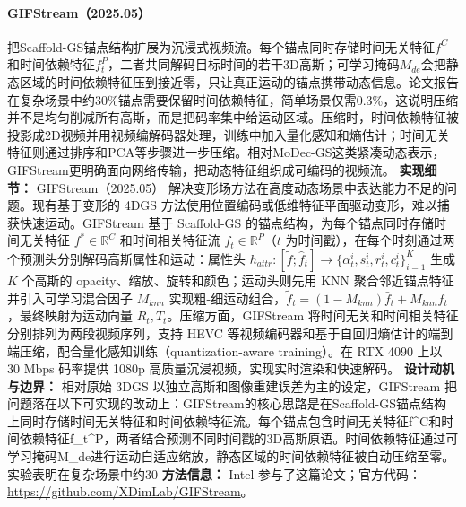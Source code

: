 \paragraph{GIFStream（2025.05）\cite{2505_07539}}
把Scaffold-GS锚点结构扩展为沉浸式视频流。每个锚点同时存储时间无关特征$f^C$和时间依赖特征$f_t^P$，二者共同解码目标时间的若干3D高斯；可学习掩码$M_{de}$会把静态区域的时间依赖特征压到接近零，只让真正运动的锚点携带动态信息。论文报告在复杂场景中约30\%锚点需要保留时间依赖特征，简单场景仅需0.3\%，这说明压缩并不是均匀削减所有高斯，而是把码率集中给运动区域。压缩时，时间依赖特征被投影成2D视频并用视频编解码器处理，训练中加入量化感知和熵估计；时间无关特征则通过排序和PCA等步骤进一步压缩。相对MoDec-GS这类紧凑动态表示，GIFStream更明确面向网络传输，把动态特征组织成可编码的视频流。
\textbf{实现细节：} GIFStream（2025.05） 解决变形场方法在高度动态场景中表达能力不足的问题。现有基于变形的 4DGS 方法使用位置编码或低维特征平面驱动变形，难以捕获快速运动。GIFStream 基于 Scaffold-GS 的锚点结构，为每个锚点同时存储时间无关特征 $f^{*} \in \mathbb{R}^C$ 和时间相关特征流 $f_t \in \mathbb{R}^P$（$t$ 为时间戳），在每个时刻通过两个预测头分别解码高斯属性和运动：属性头 $h_{attr}: [\tilde{f}; \hat{f}_t] \to \{\alpha^i_t, s^i_t, r^i_t, c^i_t\}_{i=1}^K$ 生成 $K$ 个高斯的 opacity、缩放、旋转和颜色；运动头则先用 KNN 聚合邻近锚点特征并引入可学习混合因子 $M_{knn}$ 实现粗-细运动组合，$\tilde{f}_t = (1{-}M_{knn})\bar{f}_t + M_{knn} f_t$，最终映射为运动向量 $R_t, T_t$。压缩方面，GIFStream 将时间无关和时间相关特征分别排列为两段视频序列，支持 HEVC 等视频编码器和基于自回归熵估计的端到端压缩，配合量化感知训练（quantization-aware training）。在 RTX 4090 上以 30 Mbps 码率提供 1080p 高质量沉浸视频，实现实时渲染和快速解码。
\textbf{设计动机与边界：} 相对原始 3DGS 以独立高斯和图像重建误差为主的设定，GIFStream 把问题落在以下可实现的改动上：GIFStream的核心思路是在Scaffold-GS锚点结构上同时存储时间无关特征和时间依赖特征流。每个锚点包含时间无关特征f\^{}C和时间依赖特征f\_t\^{}P，两者结合预测不同时间戳的3D高斯原语。时间依赖特征通过可学习掩码M\_de进行运动自适应缩放，静态区域的时间依赖特征被自动压缩至零。实验表明在复杂场景中约30%
\textbf{方法信息：} Intel 参与了这篇论文；官方代码：\url{https://github.com/XDimLab/GIFStream}。




